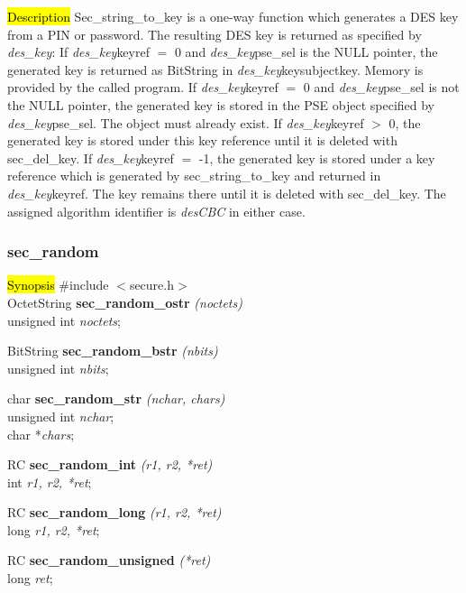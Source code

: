 
\hl{Description}
Sec\_string\_to\_key is a one-way function which generates a DES key from a PIN or password.
The resulting DES key is returned as specified by {\em des\_key}:
\be
\m If {\em des\_key}\pf keyref $=$ 0 and {\em des\_key}\pf pse\_sel is the NULL pointer, the generated key is
   returned as BitString in {\em des\_key}\pf key\pf subjectkey. Memory is provided by the called program. 
\m If {\em des\_key}\pf keyref $=$ 0 and {\em des\_key}\pf pse\_sel is not the NULL pointer, the generated key
   is stored in the PSE object specified by {\em des\_key}\pf pse\_sel. The object must already exist. 
\m If {\em des\_key}\pf keyref $>$ 0, the generated key is stored under this key reference until it is
   deleted with sec\_del\_key.
\m If {\em des\_key}\pf keyref $=$ -1, the generated key is stored under a key reference which is generated 
   by sec\_string\_to\_key and returned in {\em des\_key}\pf keyref. The key remains there until it is deleted
   with sec\_del\_key.
\ee
The assigned algorithm identifier is {\em desCBC} in either case.

\subsubsection{sec\_random}
\label{random}
\hl{Synopsis}
\#include $<$secure.h$>$ \\ [0.5cm]
OctetString {\bf *sec\_random\_ostr} {\em (noctets)} \\
unsigned int {\em noctets}; 

BitString {\bf *sec\_random\_bstr} {\em (nbits)} \\
unsigned int {\em nbits}; 

char {\bf *sec\_random\_str} {\em (nchar, chars)} \\
unsigned int {\em nchar}; \\
char *{\em chars}; 

RC {\bf sec\_random\_int} {\em (r1, r2, *ret)} \\
int {\em r1, r2, *ret}; 

RC {\bf sec\_random\_long} {\em (r1, r2, *ret)} \\
long {\em r1, r2, *ret};

RC {\bf sec\_random\_unsigned} {\em (*ret)} \\
long {\em *ret};

